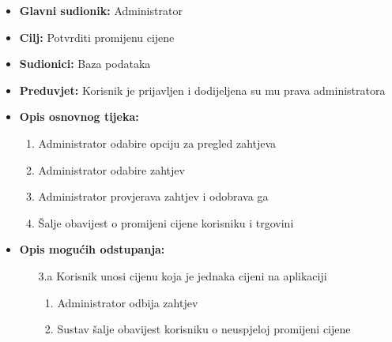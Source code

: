                         \noindent {}
					\begin{itemize}
	
						\item \textbf{Glavni sudionik: }Administrator
						\item  \textbf{Cilj:} Potvrditi promijenu cijene 
						\item  \textbf{Sudionici:} Baza podataka
						\item  \textbf{Preduvjet:} Korisnik je prijavljen i dodijeljena su mu prava administratora
						\item  \textbf{Opis osnovnog tijeka:}
						
						\item[] \begin{enumerate}
							\item Administrator odabire opciju za pregled zahtjeva
                                \item Administrator odabire zahtjev
                                \item Administrator provjerava zahtjev i odobrava ga
                                \item Šalje obavijest o promijeni cijene korisniku i trgovini
						\end{enumerate}

                            \item  \textbf{Opis mogućih odstupanja:}
						
						\item[] \begin{enumerate}
	
							\item[3.a] Korisnik unosi cijenu koja je jednaka cijeni na aplikaciji
							\item[] \begin{enumerate}
								\item Administrator odbija zahtjev
								\item Sustav šalje obavijest korisniku o neuspjeloj promijeni cijene\\
								
							\end{enumerate}
			
							
						\end{enumerate}
						
					\end{itemize}

